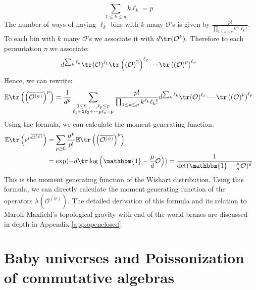 \documentclass[a4paper,11pt]{article}
\theoremstyle{definition}
\numberwithin{equation}{section}
\newcommand{\lb}{\left(}
\newcommand{\rb}{\right)}
\begin{document}
\begin{enumerate}
\begin{equation}
        \sum_{1 \leq k\leq p}k\ell_k = p
    \end{equation}
    The number of ways of having $\ell_k$ bins with $k$ many $\mathcal{O}$'s is given by $\frac{p!}{\prod_{1\leq k\leq p}k^{\ell_k}\ell_k!}$. To each bin with $k$ many $\mathcal{O}$'s we associate it with $d\tr(\mathcal{O}^k)$. Therefore to each permutation $\pi$ we associate:
    \begin{eqnarray}
        d^{\sum_k\ell_k}\tr(\mathcal{O})^{\ell_1}\tr\lb\lb\mathcal{O}\rb^2\rb^{\ell_2}\cdots\tr\lb\lb\mathcal{O}\rb^p\rb^{\ell_p}
    \end{eqnarray}
    Hence, we can rewrite:
    \begin{equation}\label{equation:simplecombinatorics}
        \mathbb{E}\tr\lb\lb\overline{\mathcal{O}^{(\psi)}}\rb^p\rb = \frac{1}{d^p}\sum_{\substack{0\leq\ell_1,\cdots,\ell_p\leq p\\ \ell_1 + 2\ell_2 + \cdots p\ell_p = p}}\frac{p!}{\prod_{1\leq k\leq p}k^{\ell_k}\ell_k!}d^{\sum_k\ell_k}\tr(\mathcal{O})^{\ell_1}\cdots\tr\lb\lb\mathcal{O}\rb^p\rb^{\ell_p}
    \end{equation}
    Using the formula, we can calculate the moment generating function:
    \begin{align}
        \begin{split}
            \mathbb{E}\tr\lb e^{\mu\overline{\mathcal{O}^{(\psi)}}}\rb &= \sum_{p\geq 0}\frac{\mu^p}{p!}\mathbb{E}\tr\lb\lb\overline{\mathcal{O}^{(\psi)}}\rb^p\rb\\&
            =\exp(-d\tr\log\lb \mathbbm{1} - \frac{\mu}{d}\mathcal{O}\rb) = \frac{1}{\det(\mathbbm{1} - \frac{\mu}{d}\mathcal{O})^d}
        \end{split}
    \end{align}
    This is the moment generating function of the Wishart distribution. Using this formula, we can directly calculate the moment generating function of the operators $\lambda(\overline{\mathcal{O}^{(\psi)}})$. The detailed derivation of this formula and its relation to Marolf-Maxfield's topological gravity with end-of-the-world branes \cite{MM} are discussed in depth in Appendix \ref{app:openclosed}.
    \end{enumerate}
    
\section{Baby universes and Poissonization of commutative algebras}\label{sec:babyuniversescommutative}
\end{document}
